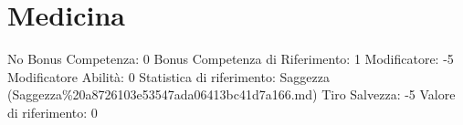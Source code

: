 \section{Medicina}\label{medicina}

\begin{description}
\tightlist
\item[Tags: ABI]
No Bonus Competenza: 0 Bonus Competenza di Riferimento: 1 Modificatore:
-5 Modificatore Abilità: 0 Statistica di riferimento: Saggezza
(Saggezza\%20a8726103e53547ada06413bc41d7a166.md) Tiro Salvezza: -5
Valore di riferimento: 0
\end{description}
